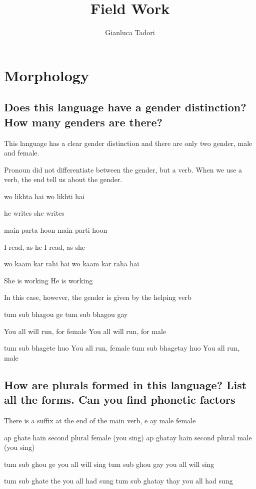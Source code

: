 \documentclass{article}
\author{Gianluca Tadori}
\title{Field Work}
\begin{document}
\maketitle

\section{Morphology}

\subsection{Does this language have a \textbf{gender} distinction? How many genders are there?}

This language has a clear gender distinction and there are only two gender, male and female.

Pronoun did not differentiate between the gender, but a verb. When we use a verb, the end tell us about the gender.

wo likhta hai
wo likhti hai

he writes
she writes

main parta hoon
main parti hoon

I read, as he
I read, as she


wo kaam kar rahi hai
wo kaam kar raha hai

She is working
He is working

In this case, however, the gender is given by the helping verb

tum sub bhagou ge
tum sub bhagou gay

You all will run, for female
You all will run, for male

tum sub bhagete huo		You all run, female
tum sub bhagetay huo	You all run, male

\subsection{How are \textbf{plurals} formed in this language? List all the forms. Can you find phonetic factors}

There is a suffix at the end of the main verb, e ay male female

ap ghate hain second plural female (you sing)
ap ghatay hain second plural male (you sing)

tum sub ghou ge     you all will sing
tum sub ghou gay    you all will sing

tum sub ghate the   you all had sung
tum sub ghatay thay you all had sung
\end{document}
